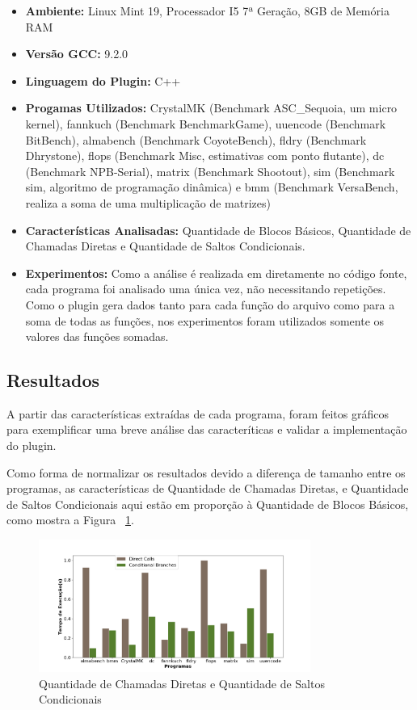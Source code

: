 \documentclass[journal]{IEEEtran}
\begin{document}
\begin{itemize}
    \item \textbf{Ambiente:} Linux Mint 19, Processador I5 7ª Geração, 8GB de Memória RAM
    \item \textbf{Versão GCC:} 9.2.0
    \item \textbf{Linguagem do Plugin:} C++
    \item \textbf{Progamas Utilizados:} CrystalMK (Benchmark ASC\_Sequoia, um micro kernel), fannkuch (Benchmark BenchmarkGame), uuencode (Benchmark BitBench), almabench (Benchmark CoyoteBench), fldry (Benchmark Dhrystone), flops (Benchmark Misc, estimativas com ponto flutante), dc (Benchmark NPB-Serial), matrix (Benchmark Shootout), sim (Benchmark sim, algoritmo de programação dinâmica) e bmm (Benchmark VersaBench, realiza a soma de uma multiplicação de matrizes)
    \item \textbf{Características Analisadas:} Quantidade de Blocos Básicos, Quantidade de Chamadas Diretas e Quantidade de Saltos Condicionais.
    \item \textbf{Experimentos:} Como a análise é realizada em diretamente no código fonte, cada programa foi analisado uma única vez, não necessitando repetições. Como o plugin gera dados tanto para cada função do arquivo como para a soma de todas as funções, nos experimentos foram utilizados somente os valores das funções somadas.
\end{itemize}

\subsection{Resultados}

A partir das características extraídas de cada programa, foram feitos gráficos para exemplificar uma breve análise das caracteríticas e validar a implementação do plugin.

Como forma de normalizar os resultados devido a diferença de tamanho entre os programas, as características de Quantidade de Chamadas Diretas, e Quantidade de Saltos Condicionais aqui estão em proporção à Quantidade de Blocos Básicos, como mostra a Figura ~\ref{graph}.

\begin{figure}[h]
\centering
\includegraphics[width=3.5in]{graph.png}
\captionsetup{justification=centering}
\caption{Quantidade de Chamadas Diretas e Quantidade de Saltos Condicionais}
\label{graph}
\end{figure}
\end{document}
